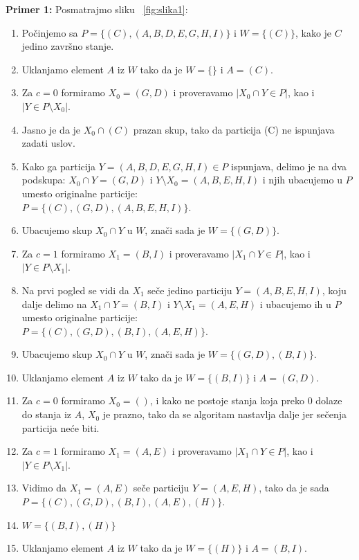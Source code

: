 \documentclass[a4paper]{article}
\begin{document}
\vspace{10pt}
\noindent \textbf{Primer 1:}
Posmatrajmo sliku ~\ref{fig:slika1}:
\begin{enumerate}
\item Počinjemo sa $P = \{(C), (A, B, D, E, G, H, I)\}$ i $W = \{(C)\}$, kako je $C$ jedino završno stanje.
\item Uklanjamo element $A$ iz $W$ tako da je $W = \{\}$ i $A = (C)$.
\item Za $c = 0$ formiramo $X_{0} = (G, D)$ i proveravamo $|X_{0} \cap Y \in P|$, kao i $| Y \in P \setminus X_{0}|$.
\item Jasno je da je $X_{0} \cap (C)$ prazan skup, tako da particija (C) ne ispunjava zadati uslov.
\item Kako ga particija $Y = (A, B, D, E, G, H, I) \in P$ ispunjava, delimo je na dva podskupa: $X_{0} \cap Y = (G, D)$ i $Y \setminus X_{0} = (A, B, E, H, I)$ i njih ubacujemo u $P$ umesto originalne particije: \\ $P = \{(C), (G, D), (A, B, E, H, I)\}$.
\item Ubacujemo skup $X_{0} \cap Y$ u $W$, znači sada je $W = \{(G, D)\}$.
\item Za $c = 1$ formiramo $X_{1} = (B, I)$ i proveravamo $|X_{1} \cap Y \in P|$, kao i $| Y \in P \setminus X_{1}|$.
\item Na prvi pogled se vidi da $X_{1}$ seče jedino particiju $Y = (A, B, E, H, I)$, koju dalje delimo na $X_{1} \cap Y = (B, I)$ i $Y \setminus X_{1} = (A, E, H)$ i ubacujemo ih u $P$ umesto originalne particije: \\ $P = \{(C), (G, D), (B, I), (A, E, H)\}$.
\item Ubacujemo skup $X_{0} \cap Y$ u $W$, znači sada je $W = \{(G, D), (B, I)\}$.
\item Uklanjamo element $A$ iz $W$ tako da je $W = \{(B, I)\}$ i $A = (G, D)$.
\item Za $c = 0$ formiramo $X_{0} = ()$, i kako ne postoje stanja koja preko $0$ dolaze do stanja iz $A$, $X_{0}$ je prazno, tako da se algoritam nastavlja dalje jer sečenja particija neće biti.
\item Za $c = 1$ formiramo $X_{1} = (A, E)$ i proveravamo $|X_{1} \cap Y \in P|$, kao i $| Y \in P \setminus X_{1}|$.
\item Vidimo da $X_{1} = (A, E)$ seče particiju $Y = (A, E, H)$, tako da je sada $P = \{(C), (G, D), (B, I), (A, E), (H)\}$.
\item $W = \{(B, I), (H)\}$
\item Uklanjamo element $A$ iz $W$ tako da je $W = \{(H)\}$ i $A = (B, I)$.

\end{enumerate}
\end{document}
